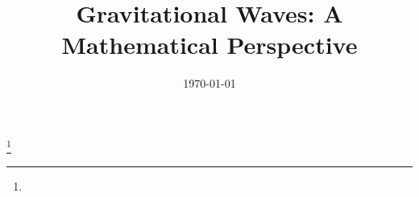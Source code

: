 \newcommand*{\bfrac}[2]{\genfrac{}{}{0pt}{}{#1}{#2}}

\title{Gravitational Waves: A Mathematical Perspective}
\author[Hashem A. Damrah]{}
\date{\today}

\def\subjclass{Primary: 83C35, 83C22; Secondary: 83C05, 83C15.}
\def\keywords{Gravitational waves, General relativity, Einstein field equations, Mathematical physics.}
\def\subjclassname{}

\thanks{}

\newcommand\bs{Berry and Sauer~\cite{1606.02353}}
\newcommand\blfootnote[1]{%
  \begingroup
  \renewcommand\thefootnote{}\footnote{#1}%
  \addtocounter{footnote}{-1}%
  \endgroup
}

\newcommand\codv[3][]{\odv[style-inf-num=\mathrm{D},#1]{#2}{#3}}
